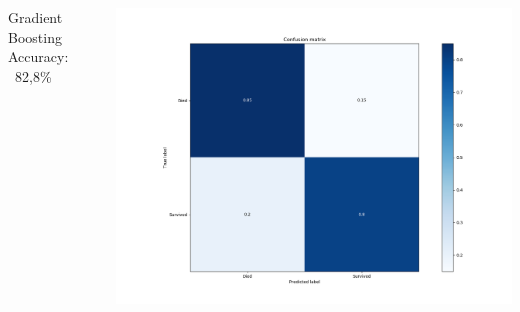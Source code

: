 \begin{frame}[fragile]
\begin{columns}[c]
    Gradient Boosting
    \newline Accuracy: ~82,8\%
	\begin{center}		
		\includegraphics[height=0.3\textheight]{images/confusion_matrix_gradient_boosting.png}
	\end{center}
    \end{columns}
\end{frame}